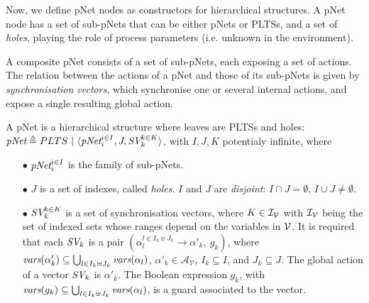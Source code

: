 \documentclass[smallcondensed]{svjour3}
\newcommand{\cA}{\ensuremath{\mathcal{A}}}
\newcommand{\cV}{\ensuremath{\mathcal{V}}}
\newcommand{\variables}{\ensuremath{\cV}}
\newcommand{\actions}[1]{\ensuremath{\cA_{#1}}}
\def\AlgAS{\mathcal{A}_S}
\newcommand{\YX}[1]{{\color{red}#1}}
\begin{document}
Now, we define
pNet nodes as constructors for hierarchical structures.
A pNet node has a set of sub-pNets that can be either pNets or PLTSs, and a
set of \emph{holes}, playing the role of process parameters
(i.e. unknown in the environment).

A composite pNet consists of a set of sub-pNets, each exposing
a set of actions. %
The relation between the actions of a pNet and those of its sub-pNets
is given by  \emph{synchronisation vectors}, which %
synchronise one or several internal actions, and
expose a single resulting global action.



\begin{definition}[pNets]\label{def-pnets}
	A pNet is a hierarchical structure where leaves are PLTSs and holes:
	$\pNet\triangleq PLTS~|~\langle \pNet_i^{i\in I}, J, \symb{SV}_k^{k\in 
		K}\rangle$, with $I, J, K$ potentialy infinite,
	where
	\begin{itemize}
		\item[$\bullet$] $\pNet_i^{i\in I}$ is the family of sub-pNets.
		
		\item[$\bullet$] $J$ is a set of indexes, called \emph{holes}.
		$I$ and $J$ are \emph{disjoint}: $I\!\cap\! J=\emptyset$,  $I\!\cup\! J\neq\emptyset$.
		
		\item[$\bullet$] $\symb{SV}_k^{k\in K}$ is a set of
		synchronisation vectors, \YX{where $K\in\I_\P$ with $\I_\P$ being the set of indexed
		sets whose ranges depend on the variables in $\P$}.  It is required that each
		$\symb{SV}_k$ is a pair $(\alpha_{l}^{l\in I_k \uplus J_k}\to\alpha'_k,\ g_k)$, where
		$\vars(\alpha'_k)\subseteq \bigcup_{l\in I_k\uplus 
			J_k}{\vars({\alpha_l})}$, $\alpha'_k\in \actions{\variables}$, $I_k\subseteq I$, and $J_k\subseteq J$. The global action of a vector $\symb{SV}_k$ is
		$\alpha'_k$. The Boolean expression $g_k $, with $\vars(g_k)\subseteq \bigcup_{l\in 
			I_k\uplus J_k}{\vars({\alpha_l})}$, is a guard associated to the vector.
		
	\end{itemize}
\end{definition}
\end{document}
